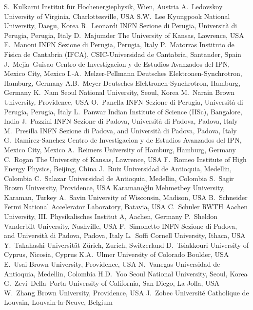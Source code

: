 S.~Kulkarni {Institut f\"{u}r Hochenergiephysik, Wien, Austria}
A.~Ledovskoy {University of Virginia, Charlottesville, USA}
S.W.~Lee {Kyungpook National University, Daegu, Korea}
R.~Leonardi {INFN Sezione di Perugia, Universit\`{a} di Perugia, Perugia, Italy}
D.~Majumder {The University of Kansas, Lawrence, USA}
E.~Manoni {INFN Sezione di Perugia, Perugia, Italy}
P.~Matorras {Instituto de F\'{i}sica de Cantabria (IFCA), CSIC-Universidad de Cantabria, Santander, Spain}
J.~Mejia~Guisao {Centro de Investigacion y de Estudios Avanzados del IPN, Mexico City, Mexico}
I.-A.~Melzer-Pellmann {Deutsches Elektronen-Synchrotron, Hamburg, Germany}
A.B.~Meyer {Deutsches Elektronen-Synchrotron, Hamburg, Germany}
K.~Nam {Seoul National University, Seoul, Korea}
M.~Narain {Brown University, Providence, USA}
O.~Panella {INFN Sezione di Perugia, Universit\`{a} di Perugia, Perugia, Italy}
L.~Panwar {Indian Institute of Science (IISc), Bangalore, India}
J.~Pazzini {INFN Sezione di Padova, Universit\`{a} di Padova, Padova, Italy}
M.~Presilla {INFN Sezione di Padova, and Universit\`{a} di Padova, Padova, Italy}
G.~Ramirez-Sanchez {Centro de Investigacion y de Estudios Avanzados del IPN, Mexico City, Mexico}
A.~Reimers {University of Hamburg, Hamburg, Germany}
C.~Rogan {The University of Kansas, Lawrence, USA}
F.~Romeo {Institute of High Energy Physics, Beijing, China}
J.~Ruiz {Universidad de Antioquia, Medellin, Colombia}
C.~Salazar {Universidad de Antioquia, Medellin, Colombia}
S.~Sagir {Brown University, Providence, USA} {Karamano\u{g}lu Mehmetbey University, Karaman, Turkey}
A.~Savin {University of Wisconsin, Madison, USA}
B.~Schneider {Fermi National Accelerator Laboratory, Batavia, USA}
C.~Schuler {RWTH Aachen University, III. Physikalisches Institut A, Aachen, Germany}
P.~Sheldon {Vanderbilt University, Nashville, USA}
F.~Simonetto {INFN Sezione di Padova, and Universit\`{a} di Padova, Padova, Italy}
L.~Soffi {Cornell University, Ithaca, USA}
Y.~Takahashi {Universit\"{a}t Z\"{u}rich, Zurich, Switzerland}
D.~Tsiakkouri {University of Cyprus, Nicosia, Cyprus}
K.A.~Ulmer {University of Colorado Boulder, USA}
E.~Usai {Brown University, Providence, USA}
N.~Vanegas {Universidad de Antioquia, Medellin, Colombia}
H.D.~Yoo {Seoul National University, Seoul, Korea}
G.~Zevi~Della~Porta {University of California, San Diego, La Jolla, USA}
W.~Zhang {Brown University, Providence, USA}
J.~Zobec {Universit\'{e} Catholique de Louvain, Louvain-la-Neuve, Belgium}